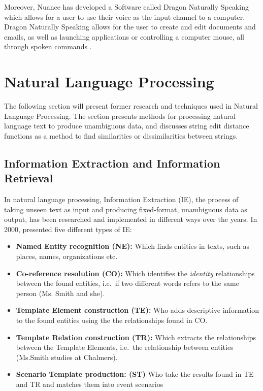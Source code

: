 Moreover, Nuance has developed a Software called Dragon Naturally Speaking which allows for a user to use their voice as the input channel to a computer. Dragon Naturally Speaking allows for the user to create and edit documents and emails, as well as launching applications or controlling a computer mouse, all through  spoken commands \citep{nuancedragon}.
\section{Natural Language Processing}
\label{sec:natlangprocsess}
The following section will present former research and techniques used in Natural Language Processing. The section presents methods for processing natural language text to produce unambiguous data, and discusses string edit distance functions as a method to find similarities or dissimilarities between strings.

\subsection{Information Extraction and Information Retrieval}
In natural language processing, Information Extraction (IE), the process of taking unseen text as input and producing fixed-format, unambiguous data as output, has been researched and implemented in different ways over the years. In 2000, \citet{cunningham2000} presented five different types of IE: 

\begin{itemize}
  \item \textbf{Named Entity recognition (NE):} Which finds entities in texts, such as places, names, organizations etc.
  \item \textbf{Co-reference resolution (CO):} Which identifies the \emph{identity} relationships between the found entities, i.e.\ if two different words refers to the same person (Ms. Smith and she).
  \item \textbf{Template Element construction (TE):} Who adds descriptive information to the found entities using the the relationships found in CO.
  \item \textbf{Template Relation construction (TR):} Which extracts the relationships between the Template Elements, i.e.\ the relationship between entities (Ms.Smith studies at Chalmers).
  \item \textbf{Scenario Template production: (ST)} Who take the results found in TE and TR and matches them into event scenarios
\end{itemize}


